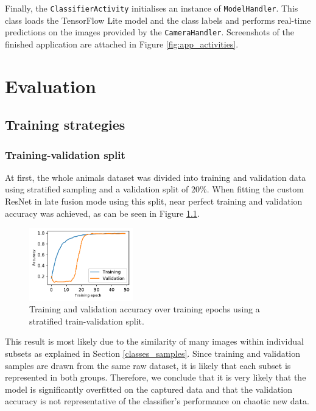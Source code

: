\documentclass{l4proj}
\begin{document}
Finally, the \lstinline{ClassifierActivity} initialises an instance of \lstinline{ModelHandler}. This class loads the TensorFlow Lite model and the class labels and performs real-time predictions on the images provided by the \lstinline{CameraHandler}. Screenshots of the finished application are attached in Figure \ref{fig:app_activities}.




\chapter{Evaluation}
\label{evaluation}

\section{Training strategies}

\subsection{Training-validation split}
\label{eval_train_val_split}

At first, the whole animals dataset was divided into training and validation data using stratified sampling and a validation split of $20\%$. When fitting the custom ResNet in late fusion mode using this split, near perfect training and validation accuracy was achieved, as can be seen in Figure \ref{fig:acc_stratified}.  

\begin{figure}[ht]
  \centering
    \includegraphics[width=0.4\textwidth]{images/evaluation/stratified/accuracy}
  \caption{Training and validation accuracy over training epochs using a stratified train-validation split.}
  \label{fig:acc_stratified}
\end{figure}

This result is most likely due to the similarity of many images within individual subsets as explained in Section \ref{classes_samples}. Since training and validation samples are drawn from the same raw dataset, it is likely that each subset is represented in both groups. Therefore, we conclude that it is very likely that the model is significantly overfitted on the captured data and that the validation accuracy is not representative of the classifier's performance on chaotic new data. 
\end{document}

